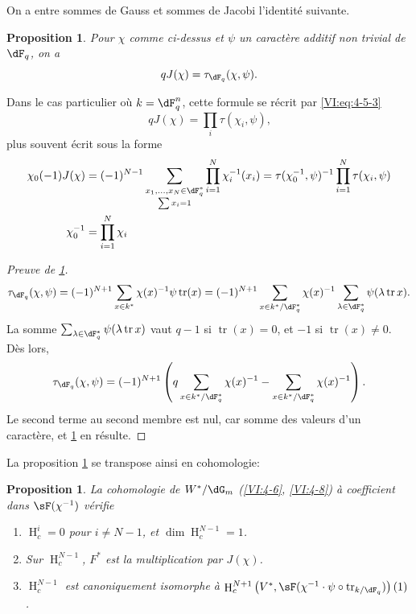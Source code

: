 \documentclass[oneside]{book}
\DeclareMathOperator{\h}{H}
\DeclareMathOperator{\tr}{tr}
\theoremstyle{sga-source}
\theoremstyle{sga-source-dash}
\theoremstyle{sga-source-dotdash}
\theoremstyle{sga-source-number-note-dash}
\theoremstyle{sga-source-note-number-dotdash}
\theoremstyle{sga-source-example-dotdash}
\theoremstyle{sga-source-inline-number}
\theoremstyle{sga-source-bare-number}
\theoremstyle{sga-source}
\newtheorem{proposition_}[subsection]{Proposition}
\newcommand{\PrintPage}[1]{}\newcommand{\MathPage}[1]{}\newcommand{\PrintCite}[2]{#1}\newcommand{\var}[3]{#1}
\begin{document}
On a entre sommes de Gauss et sommes de Jacobi l'identité suivante. 





\PrintPage{204}
\begin{proposition_}\label{VI:4-15}
Pour $\chi$ comme ci-dessus et $\psi$ un caractère additif non trivial de 
$\dF_q$, on a 
\[
  q J(\chi) = \tau_{\dF_q}(\chi,\psi) \text{.} 
\]
\end{proposition_}

Dans le cas particulier où $k=\dF_q^n$, cette formule se récrit par 
\eqref{VI:eq:4-5-3} 
\begin{equation*}\tag{4.15.1}\label{VI:eq:4-15-1}
  q J(\chi) = \prod_i \tau(\chi_i,\psi) \text{,} 
\end{equation*}
plus souvent écrit sous la forme 
\begin{align*}
  \chi_0(-1) J(\chi) &= (-1)^{N-1} \sum_{\substack{x_1,\dots,x_N\in \dF_q^\ast \\ \sum x_i = 1}} \prod_{i=1}^N \chi_i^{-1}(x_i) = \tau(\chi_0^{-1},\psi)^{-1} \prod_{i=1}^N \tau(\chi_i,\psi) \\
  \chi_0^{-1} &= \prod_{i=1}^N \chi_i 
\end{align*}





\begin{proof}[Preuve de \ref{VI:4-15}]
\[
  \tau_{\dF_q}(\chi,\psi) = (-1)^{N+1} \sum_{x\in k^\ast} \chi(x)^{-1} \psi \tr(x) = (-1)^{N+1} \sum_{x\in k^\ast/\dF_q^\ast} \chi(x)^{-1} \sum_{\lambda\in \dF_q^\ast} \psi(\lambda \tr x) \text{.}
\]
La somme $\sum_{\lambda\in \dF_q^\ast} \psi(\lambda \tr x)$ vaut $q-1$ si 
$\tr(x)=0$, et $-1$ si $\tr(x)\ne 0$. Dès lors, 
\[
  \tau_{\dF_q}(\chi,\psi) = (-1)^{N+1} \left(\var{q\sum_{x\in k^\ast/\dF_q^\ast} \chi(x)^{-1}}{q\sum_{\substack{x\in k^\ast/\dF_q^\ast\\\tr(x)=0}} \chi(x)^{-1}}{S45-SOL-0843} - \sum_{x\in k^\ast/\dF_q^\ast} \chi(x)^{-1}\right) \text{.}
\]
Le second terme au second membre est nul, car somme des valeurs d'un 
caractère, et \ref{VI:4-15} en résulte. 
\end{proof}

La proposition \ref{VI:4-15} se transpose ainsi en cohomologie: 





\begin{proposition_}\label{VI:4-16}
La cohomologie de $W^\ast/\dG_m$ (\ref{VI:4-6}, \ref{VI:4-8}) à coefficient 
dans $\sF(\chi^{-1})$ vérifie 
\begin{enumerate}[\indent (i)]
  \item $\h_c^i=0$ pour $i\ne N-1$, et $\dim \h_c^{N-1}{}=1$. 
  \item Sur $\h_c^{N-1}$, $F^\ast$ est la multiplication par $J(\chi)$. 
  \item $\h_c^{N-1}$ est canoniquement isomorphe à 
    $\h_c^{N+1}\left(V^\ast,\sF(\chi^{-1}\cdot \psi\circ \tr_{k/\dF_q})\right)(1)$. 
\end{enumerate}
\end{proposition_}
\end{document}

